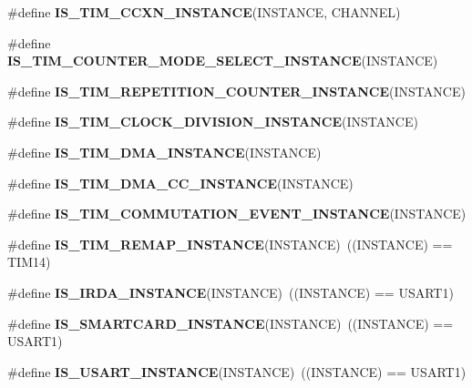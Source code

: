\begin{DoxyCompactItemize}
\item 
\#define {\bfseries I\+S\+\_\+\+T\+I\+M\+\_\+\+C\+C\+X\+N\+\_\+\+I\+N\+S\+T\+A\+N\+CE}(I\+N\+S\+T\+A\+N\+CE,  C\+H\+A\+N\+N\+EL)
\item 
\#define {\bfseries I\+S\+\_\+\+T\+I\+M\+\_\+\+C\+O\+U\+N\+T\+E\+R\+\_\+\+M\+O\+D\+E\+\_\+\+S\+E\+L\+E\+C\+T\+\_\+\+I\+N\+S\+T\+A\+N\+CE}(I\+N\+S\+T\+A\+N\+CE)
\item 
\#define {\bfseries I\+S\+\_\+\+T\+I\+M\+\_\+\+R\+E\+P\+E\+T\+I\+T\+I\+O\+N\+\_\+\+C\+O\+U\+N\+T\+E\+R\+\_\+\+I\+N\+S\+T\+A\+N\+CE}(I\+N\+S\+T\+A\+N\+CE)
\item 
\#define {\bfseries I\+S\+\_\+\+T\+I\+M\+\_\+\+C\+L\+O\+C\+K\+\_\+\+D\+I\+V\+I\+S\+I\+O\+N\+\_\+\+I\+N\+S\+T\+A\+N\+CE}(I\+N\+S\+T\+A\+N\+CE)
\item 
\#define {\bfseries I\+S\+\_\+\+T\+I\+M\+\_\+\+D\+M\+A\+\_\+\+I\+N\+S\+T\+A\+N\+CE}(I\+N\+S\+T\+A\+N\+CE)
\item 
\#define {\bfseries I\+S\+\_\+\+T\+I\+M\+\_\+\+D\+M\+A\+\_\+\+C\+C\+\_\+\+I\+N\+S\+T\+A\+N\+CE}(I\+N\+S\+T\+A\+N\+CE)
\item 
\#define {\bfseries I\+S\+\_\+\+T\+I\+M\+\_\+\+C\+O\+M\+M\+U\+T\+A\+T\+I\+O\+N\+\_\+\+E\+V\+E\+N\+T\+\_\+\+I\+N\+S\+T\+A\+N\+CE}(I\+N\+S\+T\+A\+N\+CE)
\item 
\mbox{\label{group___exported__macro_ga6bb03cf116b07bfe1bd527f8ab61a7f9}} 
\#define {\bfseries I\+S\+\_\+\+T\+I\+M\+\_\+\+R\+E\+M\+A\+P\+\_\+\+I\+N\+S\+T\+A\+N\+CE}(I\+N\+S\+T\+A\+N\+CE)~((I\+N\+S\+T\+A\+N\+CE) == T\+I\+M14)
\item 
\mbox{\label{group___exported__macro_ga98ae6698dc54d8441fce553a65bf5429}} 
\#define {\bfseries I\+S\+\_\+\+I\+R\+D\+A\+\_\+\+I\+N\+S\+T\+A\+N\+CE}(I\+N\+S\+T\+A\+N\+CE)~((I\+N\+S\+T\+A\+N\+CE) == U\+S\+A\+R\+T1)
\item 
\mbox{\label{group___exported__macro_gab2734c105403831749ccb34eeb058988}} 
\#define {\bfseries I\+S\+\_\+\+S\+M\+A\+R\+T\+C\+A\+R\+D\+\_\+\+I\+N\+S\+T\+A\+N\+CE}(I\+N\+S\+T\+A\+N\+CE)~((I\+N\+S\+T\+A\+N\+CE) == U\+S\+A\+R\+T1)
\item 
\mbox{\label{group___exported__macro_gafbce654f84a7c994817453695ac91cbe}} 
\#define {\bfseries I\+S\+\_\+\+U\+S\+A\+R\+T\+\_\+\+I\+N\+S\+T\+A\+N\+CE}(I\+N\+S\+T\+A\+N\+CE)~((I\+N\+S\+T\+A\+N\+CE) == U\+S\+A\+R\+T1)

\end{DoxyCompactItemize}
